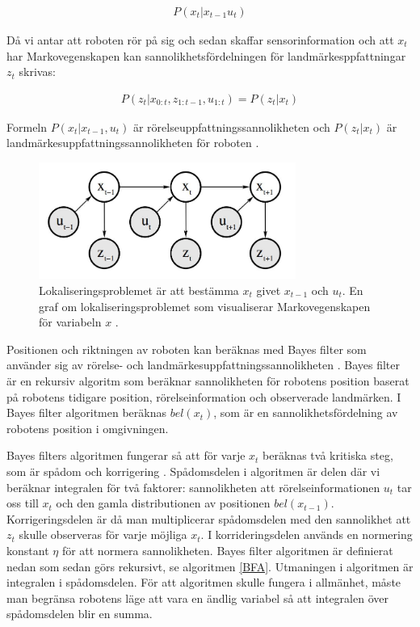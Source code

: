 \begin{align}
    P(x_t | x_{t-1} u_{t})
\end{align}

Då vi antar att roboten rör på sig och sedan skaffar sensorinformation och att $x_t$ har Markovegenskapen kan sannolikhetsfördelningen för landmärkesppfattningar $z_t$ skrivas:

\begin{align}
    P(z_t | x_{0:t}, z_{1:t-1}, u_{1:t}) = P(z_t|x_t)
\end{align}

Formeln $P(x_t|x_{t-1}, u_{t})$ är rörelseuppfattningssannolikheten och $P(z_t|x_t)$ är landmärkesuppfattningssannolikheten för roboten \citep{ProbabilisticRobotics}. 

\begin{figure}[ht]
    \begin{center}
    \includegraphics[width=0.75\textwidth]{markov.JPG}
    \caption{Lokaliseringsproblemet är att bestämma $x_t$ givet $x_{t-1}$ och $u_t$. En graf om lokaliseringsproblemet som visualiserar Markovegenskapen för variabeln $x$ \citep{ProbabilisticRobotics}.}
    \label{markov}
    \end{center}
\end{figure}

Positionen och riktningen av roboten kan beräknas med Bayes filter som använder sig av rörelse- och landmärkesuppfattningssannolikheten \citep{ProbabilisticRobotics}. Bayes filter är en rekursiv algoritm som beräknar sannolikheten för robotens position baserat på robotens tidigare position, rörelseinformation och observerade landmärken. I Bayes filter algoritmen beräknas $bel(x_t)$, som är en sannolikhetsfördelning av robotens position i omgivningen.

Bayes filters algoritmen fungerar så att för varje $x_t$ beräknas två kritiska steg, som är spådom och korrigering \citep{ProbabilisticRobotics}. Spådomsdelen i algoritmen är delen där vi beräknar integralen för två faktorer: sannolikheten att rörelseinformationen $u_t$ tar oss till $x_t$ och den gamla distributionen av positionen $bel(x_{t-1})$. Korrigeringsdelen är då man multiplicerar spådomsdelen med den sannolikhet att $z_t$ skulle observeras för varje möjliga $x_t$. I korrideringsdelen används en normering konstant $\eta$ för att normera sannolikheten. Bayes filter algoritmen är definierat nedan som sedan görs rekursivt, se algoritmen \ref{BFA}. Utmaningen i algoritmen är integralen i spådomsdelen. För att algoritmen skulle fungera i allmänhet, måste man begränsa robotens läge att vara en ändlig variabel så att integralen över spådomsdelen blir en summa. 

